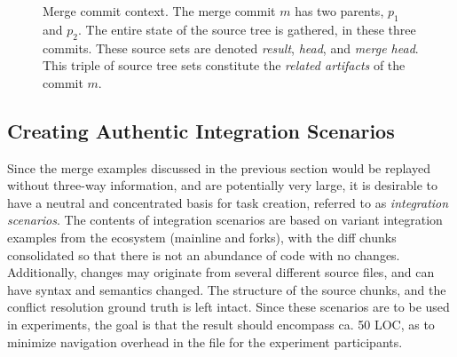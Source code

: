 \begin{figure}[ht]
    \centering
    \caption{Merge commit context. The merge commit $m$ has two parents, $p_1$ and $p_2$. The entire state of the source tree is gathered, in these three commits. These source sets are denoted \textit{result}, \textit{head}, and \textit{merge head}. This triple of source tree sets constitute the \textit{related artifacts} of the commit $m$.}
    \label{intentions:mergespace}
\end{figure}

\subsection{Creating Authentic Integration Scenarios}
Since the merge examples discussed in the previous section would be replayed without three-way information, and are potentially very large, it is desirable to have a neutral and concentrated basis for task creation, referred to as \textit{integration scenarios}. The contents of integration scenarios are based on variant integration examples from the ecosystem (mainline and forks), with the diff chunks consolidated so that there is not an abundance of code with no changes. Additionally, changes may originate from several different source files, and can have syntax and semantics changed. The structure of the source chunks, and the conflict resolution ground truth is left intact. Since these scenarios are to be used in experiments, the goal is that the result should encompass ca. 50 LOC, as to minimize navigation overhead in the file for the experiment participants.


